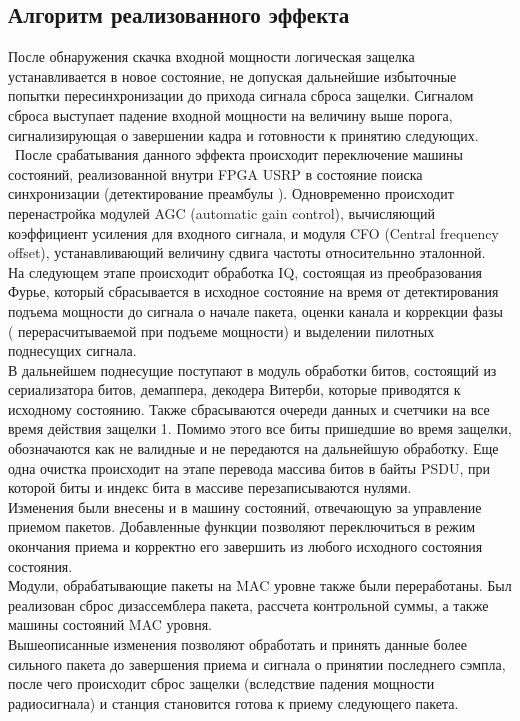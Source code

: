 \documentclass{llncs}
\begin{document}
\subsection{Алгоритм реализованного эффекта}
После обнаружения скачка входной мощности логическая защелка устанавливается в новое состояние, не допуская дальнейшие избыточные попытки пересинхронизации до прихода сигнала сброса защелки. Сигналом сброса выступает падение входной мощности на величину выше порога, сигнализирующая о завершении кадра и готовности к принятию следующих.
\\\
После срабатывания данного эффекта происходит переключение машины состояний, реализованной внутри FPGA USRP в состояние поиска синхронизации (детектирование преамбулы ). Одновременно происходит перенастройка модулей AGC (automatic gain control), вычисляющий коэффициент усиления для входного сигнала, и модуля CFO (Central frequency offset), устанавливающий величину сдвига частоты относительнно эталонной. %
\\
На следующем этапе происходит обработка IQ, состоящая из преобразования Фурье, который сбрасывается в исходное состояние на время от детектирования подъема мощности до сигнала о начале пакета, оценки канала и коррекции фазы ( перерасчитываемой при подъеме мощности) и выделении пилотных поднесущих сигнала.
\\
В дальнейшем поднесущие поступают в модуль обработки битов, состоящий из  сериализатора битов, демаппера, декодера Витерби, которые приводятся к исходному состоянию. Также сбрасываются  очереди данных и счетчики на все время действия защелки 1. Помимо этого все биты пришедшие во время защелки, обозначаются как не валидные и не передаются на дальнейшую обработку. Еще одна очистка происходит на этапе перевода массива битов в байты PSDU, при которой биты и индекс бита в массиве  перезаписываются нулями.
\\
Изменения были внесены и в машину состояний, отвечающую за управление приемом пакетов. Добавленные функции позволяют переключиться в режим окончания приема и корректно его завершить из любого исходного состояния  состояния. 
\\
Модули, обрабатывающие пакеты на MAC уровне также были переработаны. Был реализован сброс дизассемблера пакета, рассчета контрольной суммы, а также машины состояний MAC уровня.
\\
Вышеописанные изменения позволяют  обработать и принять данные более сильного пакета до завершения приема и сигнала о принятии последнего сэмпла, после чего происходит сброс защелки (вследствие падения мощности радиосигнала) и станция становится готова к приему следующего пакета.
\end{document}
